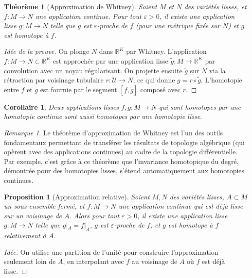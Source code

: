 \documentclass[12pt,a4paper,openany]{book}
\theoremstyle{definition}
\theoremstyle{plain}
\newtheorem{theoreme}[definition]{Théorème}
\newtheorem{proposition}[definition]{Proposition}
\newtheorem{corollaire}[definition]{Corollaire}
\theoremstyle{remark}
\newtheorem{remarque}[definition]{Remarque}
\newcommand{\R}{\mathbb{R}}
\begin{document}
\begin{theoreme}[Approximation de Whitney]\label{thm:whitney-approx}
Soient $M$ et $N$ des variétés lisses, et $f : M \to N$ une application
continue. Pour tout $\varepsilon > 0$, il existe une application lisse
$g : M \to N$ telle que $g$ est $\varepsilon$-proche de $f$ (pour une métrique
fixée sur $N$) et $g$ est homotope à $f$.
\end{theoreme}

\begin{proof}[Idée de la preuve]
On plonge $N$ dans $\R^K$ par Whitney. L'application $f : M \to N \subset \R^K$
est approchée par une application lisse $\tilde{g} : M \to \R^K$ par convolution
avec un noyau régularisant. On projette ensuite $\tilde{g}$ sur $N$ via la
rétraction par voisinage tubulaire $r : \mathcal{U} \to N$, ce qui donne
$g = r \circ \tilde{g}$. L'homotopie entre $f$ et $g$ est fournie par le
segment $[f, \tilde{g}]$ composé avec $r$.
\end{proof}

\begin{corollaire}\label{cor:approx-homotopie}
Deux applications lisses $f, g : M \to N$ qui sont homotopes par une homotopie
continue sont aussi homotopes par une homotopie lisse.
\end{corollaire}

\begin{remarque}
Le théorème d'approximation de Whitney est l'un des outils fondamentaux
permettant de transférer les résultats de topologie algébrique (qui opèrent avec
des applications continues) au cadre de la topologie différentielle. Par exemple,
c'est grâce à ce théorème que l'invariance homotopique du degré, démontrée pour
des homotopies lisses, s'étend automatiquement aux homotopies continues.
\end{remarque}

\begin{proposition}[Approximation relative]\label{prop:approx-relative}
Soient $M, N$ des variétés lisses, $A \subset M$ un sous-ensemble fermé, et
$f : M \to N$ une application continue qui est déjà lisse sur un voisinage de
$A$. Alors pour tout $\varepsilon > 0$, il existe une application lisse
$g : M \to N$ telle que $g|_A = f|_A$, $g$ est $\varepsilon$-proche de $f$, et
$g$ est homotope à $f$ relativement à $A$.
\end{proposition}

\begin{proof}[Idée]
On utilise une partition de l'unité pour construire l'approximation seulement
loin de $A$, en interpolant avec $f$ au voisinage de $A$ où $f$ est déjà lisse.
\end{proof}
\end{document}
